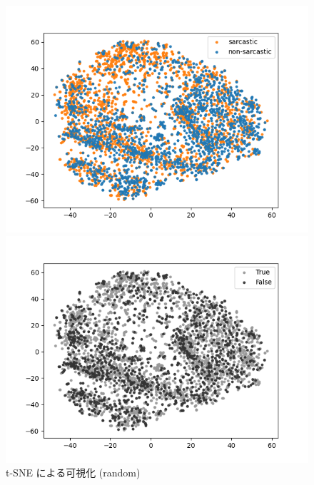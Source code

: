 \begin{figure}[tb]
\begin{center}
 	\begin{minipage}{0.4\hsize}
	\begin{center}
\includegraphics[width=\linewidth]{./figure/tsne_sarc_random.png}
	\end{center}
	\end{minipage}
 	\begin{minipage}{0.4\hsize}
	\begin{center}
\includegraphics[width=\linewidth]{./figure/tsne_TorF_random.png}
 	 \end{center}
 	\end{minipage}
	\caption{t-SNE による可視化 (random)}
	\label{fig:40_tsne5}
\end{center}
\end{figure}





%
%




